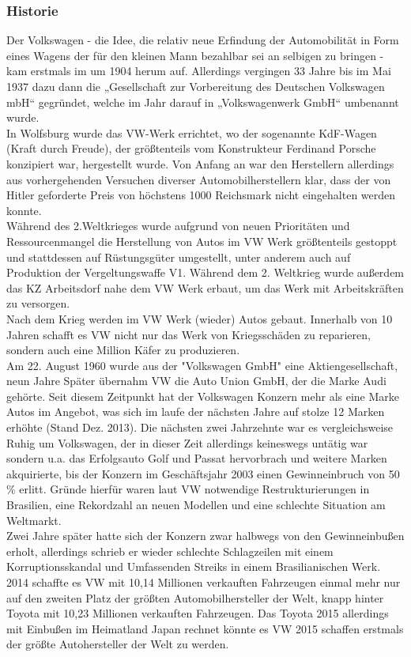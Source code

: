 \documentclass[12pt]{article}
\begin{document}
\subsubsection{Historie}
Der Volkswagen - die Idee, die relativ neue Erfindung der Automobilität in Form eines Wagens der für den kleinen Mann bezahlbar sei an selbigen zu bringen - kam erstmals im um 1904 herum auf. Allerdings vergingen 33 Jahre bis im Mai 1937 dazu dann die „Gesellschaft zur Vorbereitung des Deutschen Volkswagen mbH“ gegründet, welche im Jahr darauf in „Volkswagenwerk GmbH“ umbenannt wurde.\cite{vwchronik} \\
In Wolfsburg wurde das VW-Werk errichtet, wo der sogenannte KdF-Wagen (Kraft durch Freude), der größtenteils vom Konstrukteur Ferdinand Porsche konzipiert war, hergestellt wurde. Von Anfang an war den Herstellern allerdings aus vorhergehenden Versuchen diverser Automobilherstellern klar, dass der von Hitler geforderte Preis von höchstens 1000 Reichsmark nicht eingehalten werden konnte. \cite{geschdautos}\\
Während des 2.Weltkrieges wurde aufgrund von neuen Prioritäten und Ressourcenmangel die Herstellung von Autos im VW Werk größtenteils gestoppt und stattdessen auf Rüstungsgüter umgestellt, unter anderem auch auf Produktion der Vergeltungswaffe V1.\cite{autowp} Während dem 2. Weltkrieg wurde außerdem das KZ Arbeitsdorf nahe dem VW Werk erbaut, um das Werk mit Arbeitskräften zu versorgen.\cite{terror}  
\\
Nach dem Krieg werden im VW Werk (wieder) Autos gebaut. Innerhalb von 10 Jahren schafft es VW nicht nur das Werk von Kriegsschäden zu reparieren, sondern auch eine Million Käfer zu produzieren. \cite{ahwest}\\
Am 22. August 1960 wurde aus der "Volkswagen GmbH" eine Aktiengesellschaft, neun Jahre Später übernahm VW die Auto Union GmbH, der die Marke Audi gehörte. Seit diesem Zeitpunkt hat der Volkswagen Konzern mehr als eine Marke Autos im Angebot, was sich im laufe der nächsten Jahre auf stolze 12 Marken erhöhte (Stand Dez. 2013). \cite{vwag}
Die nächsten zwei Jahrzehnte war es vergleichsweise Ruhig um  Volkswagen, der in dieser Zeit allerdings keineswegs untätig war sondern u.a. das Erfolgsauto Golf und Passat hervorbrach und weitere Marken akquirierte, bis der Konzern im Geschäftsjahr 2003 einen Gewinneinbruch von 50 \% erlitt. Gründe hierfür waren laut VW notwendige Restrukturierungen in Brasilien, eine Rekordzahl an neuen Modellen und eine schlechte Situation am Weltmarkt. \cite{sud} \\
Zwei Jahre später hatte sich der Konzern zwar halbwegs von den Gewinneinbußen erholt, allerdings schrieb er wieder schlechte Schlagzeilen mit einem Korruptionsskandal und Umfassenden Streiks in einem Brasilianischen Werk. \cite{autowp}\\
2014 schaffte es VW mit 10,14 Millionen verkauften Fahrzeugen einmal mehr nur auf den zweiten Platz der größten Automobilhersteller der Welt, knapp hinter Toyota mit 10,23 Millionen verkauften Fahrzeugen. Das Toyota 2015 allerdings mit Einbußen im Heimatland Japan rechnet könnte es VW 2015 schaffen erstmals der größte Autohersteller der Welt zu werden.
\end{document}
